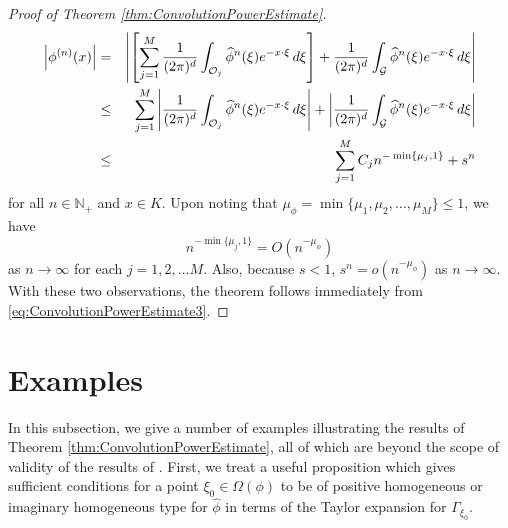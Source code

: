 \documentclass[11pt, letter]{book}
\newcommand{\lb}{\left[}
\newcommand{\rb}{\right]}
\begin{document}
\begin{proof}[Proof of Theorem \ref{thm:ConvolutionPowerEstimate}]
\begin{eqnarray}\label{eq:ConvolutionPowerEstimate3}\nonumber
    \abs{\phi^{(n)}(x)}
    &=&\abs{\lb \sum_{j=1}^M\frac{1}{(2\pi)^d}\int_{\mathcal{O}_j}\widehat{\phi}^n(\xi)e^{-x\cdot\xi}\,d\xi \rb
    +\frac{1}{(2\pi)^d}\int_{\mathcal{G}}\widehat{\phi}^n(\xi)e^{-x\cdot\xi}\,d\xi}\\\nonumber
    &\leq&\sum_{j=1}^M\abs{\frac{1}{(2\pi)^d}\int_{\mathcal{O}_j}\widehat{\phi}^n(\xi)e^{-x\cdot\xi}\,d\xi}+\abs{\frac{1}{(2\pi)^d}\int_{\mathcal{G}}\widehat{\phi}^n(\xi)e^{-x\cdot\xi}\,d\xi}\\
    &\leq&\sum_{j=1}^M C_jn^{-\min\{\mu_j,1\}}+s^n
\end{eqnarray}
for all $n\in\mathbb{N}_+$ and $x\in K$. Upon noting that $\mu_\phi=\min\{\mu_1,\mu_2,\dots,\mu_M\}\leq 1$, we have
\begin{equation*}
    n^{-\min\{\mu_j,1\}}=O(n^{-\mu_\phi})
\end{equation*}
as $n\to\infty$ for each $j=1,2,\dots M$. Also, because $s<1$, $s^n=o(n^{-\mu_\phi})$ as $n\to \infty$. With these two observations, the theorem follows immediately from \eqref{eq:ConvolutionPowerEstimate3}.
\end{proof}


\section{Examples}\label{sec:Examples}



In this subsection, we give a number of examples illustrating the results of Theorem \ref{thm:ConvolutionPowerEstimate}, all of which are beyond the scope of validity of the results of \cite{randles_convolution_2017}. First, we treat a useful proposition which gives sufficient conditions for a point $\xi_0\in\Omega(\phi)$ to be of positive homogeneous or imaginary homogeneous type for $\hat{\phi}$ in terms of the Taylor expansion for $\Gamma_{\xi_0}$.
\end{document}
